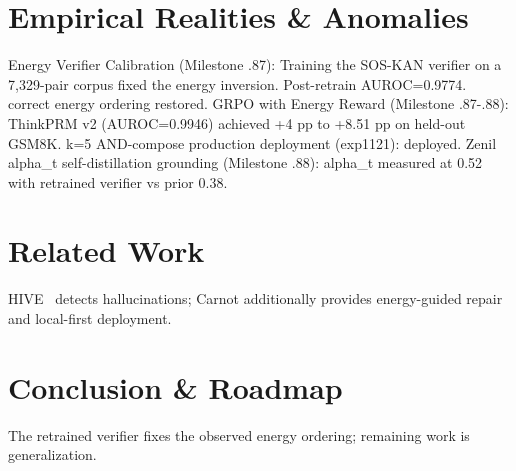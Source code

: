
\begin{abstract}
GRPO with ThinkPRM v2 improves held-out GSM8K by +4 pp to +8.51 pp.
\end{abstract}
\section{Empirical Realities \& Anomalies}
Energy Verifier Calibration (Milestone .87): Training the SOS-KAN verifier on a
7,329-pair corpus fixed the energy inversion. Post-retrain AUROC=0.9774.
correct energy ordering restored.
GRPO with Energy Reward (Milestone .87-.88): ThinkPRM v2 (AUROC=0.9946)
achieved +4 pp to +8.51 pp on held-out GSM8K.
k=5 AND-compose production deployment (exp1121): deployed.
Zenil alpha_t self-distillation grounding (Milestone .88): alpha_t measured at
0.52 with retrained verifier vs prior 0.38.
\section{Related Work}
HIVE~\cite{hive2026} detects hallucinations; Carnot additionally provides
energy-guided repair and local-first deployment.
\section{Conclusion \& Roadmap}
The retrained verifier fixes the observed energy ordering; remaining work is
generalization.
